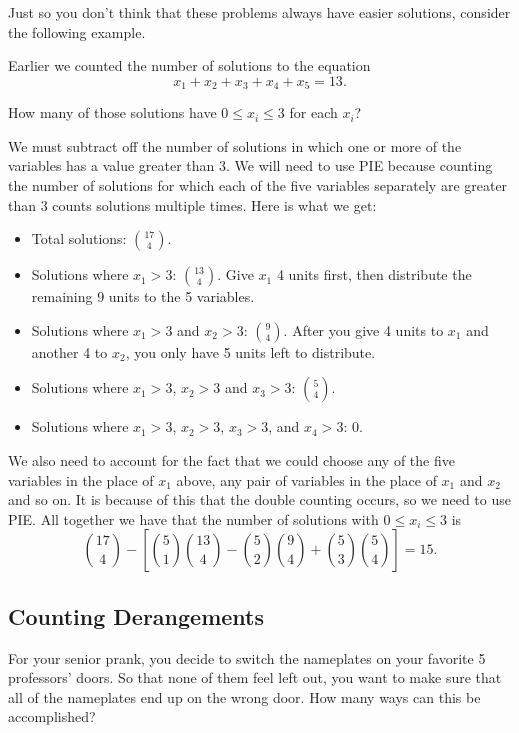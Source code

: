 \documentclass[12pt]{article}
\begin{document}
Just so you don't think that these problems always have easier solutions, consider the following example.

\begin{example}
Earlier we counted the number of solutions to the equation
\[x_1 + x_2 + x_3 + x_4 + x_5 = 13.\]

How many of those solutions have $0 \le x_i \le 3$ for each $x_i$? 


\begin{solution}
 We must subtract off the number of solutions in which one or more of the variables has a value greater than 3.  We will need to use PIE because counting the number of solutions for which each of the five variables separately are greater than 3 counts solutions multiple times.  Here is what we get:
    \begin{itemize}
      \item Total solutions: ${17 \choose 4}$.
      \item Solutions where $x_1 > 3$: ${13 \choose 4}$.  Give $x_1$ 4 units first, then distribute the remaining 9 units to the 5 variables.
      \item Solutions where $x_1 > 3$ and $x_2 > 3$: ${9 \choose 4}$. After you give 4 units to $x_1$ and another 4 to $x_2$, you only have 5 units left to distribute.
      \item Solutions where $x_1 > 3$, $x_2 > 3$ and $x_3 > 3$: ${5 \choose 4}$.
      \item Solutions where $x_1 > 3$, $x_2 > 3$, $x_3 > 3$, and $x_4 > 3$: 0.
    \end{itemize}
    We also need to account for the fact that we could choose any of the five variables in the place of $x_1$ above, any pair of variables in the place of $x_1$ and $x_2$ and so on.  It is because of this that the double counting occurs, so we need to use PIE.  All together we have that the number of solutions with $0 \le x_i \le 3$ is
    \[{17 \choose 4} - \left[{5\choose 1}{13 \choose 4} - {5 \choose 2}{9 \choose 4} + {5 \choose 3}{5 \choose 4}\right] = 15.\]
  \end{solution}
\end{example}




\newpage
\subsection{Counting Derangements}

\begin{activity}
For your senior prank, you decide to switch the nameplates on your favorite 5 professors' doors.  So that none of them feel left out, you want to make sure that all of the nameplates end up on the wrong door.  How many ways can this be accomplished?
\end{activity}
\end{document}
